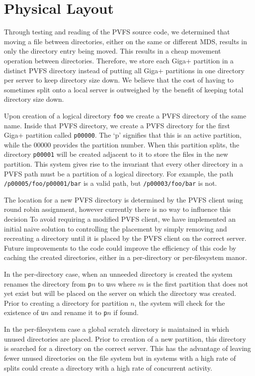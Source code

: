 \documentclass[letterpaper]{article}
\newcommand{\code}[1]{\texttt{#1}}
\begin{document}
\section{Physical Layout}
Through testing and reading of the PVFS source code, we determined that moving
a file between directories, either on the same or different MDS, results in only
the directory entry being moved.  This results in a cheap movement operation
between directories.  Therefore, we store each Giga+ partition in a distinct
PVFS directory instead of putting all Giga+ partitions in one directory per
server to keep directory size down.  We believe that the cost of having to
sometimes split onto a local server is outweighed by the benefit of keeping
total directory size down.

Upon creation of a logical directory \code{foo} we create a PVFS directory of the
same name.  Inside that PVFS directory, we create a PVFS directory for the first
Giga+ partition called \code{p00000}.  The `p' signifies that this is an active
partition, while the 00000 provides the partition number.  When this partition
splits, the directory \code{p00001} will be created adjacent to it to store the files
in the new partition.  This system gives rise to the invariant that every other
directory in a PVFS path must be a partition of a logical directory.  For
example, the path \code{/p00005/foo/p00001/bar} is a valid path, but
\code{/p00003/foo/bar} is not.

The location for a new PVFS directory is determined by the PVFS client using
round robin assignment, however currently there is no way to influence this
decision To avoid requiring a modified PVFS client, we have implemented an
initial naive solution to controlling the placement by simply removing and
recreating a directory until it is placed by the PVFS client on the correct
server.  Future improvements to the code could improve the efficiency of
this code by caching the created directories, either in a per-directory or
per-filesystem manor.  

In the per-directory case, when an unneeded directory is created the system
renames the directory from \code{p$n$} to \code{u$m$} where $m$ is the first partition
that does not yet exist but will be placed on the server on which the directory
was created.  Prior to creating a directory for partition $n$, the system will
check for the existence of \code{u$n$} and rename it to \code{p$n$} if found.

In the per-filesystem case a global scratch directory is maintained in which
unused directories are placed.  Prior to creation of a new partition, this
directory is searched for a directory on the correct server.  This has the
advantage of leaving fewer unused directories on the file system but in systems
with a high rate of splits could create a directory with a high rate of
concurrent activity.
\end{document}
